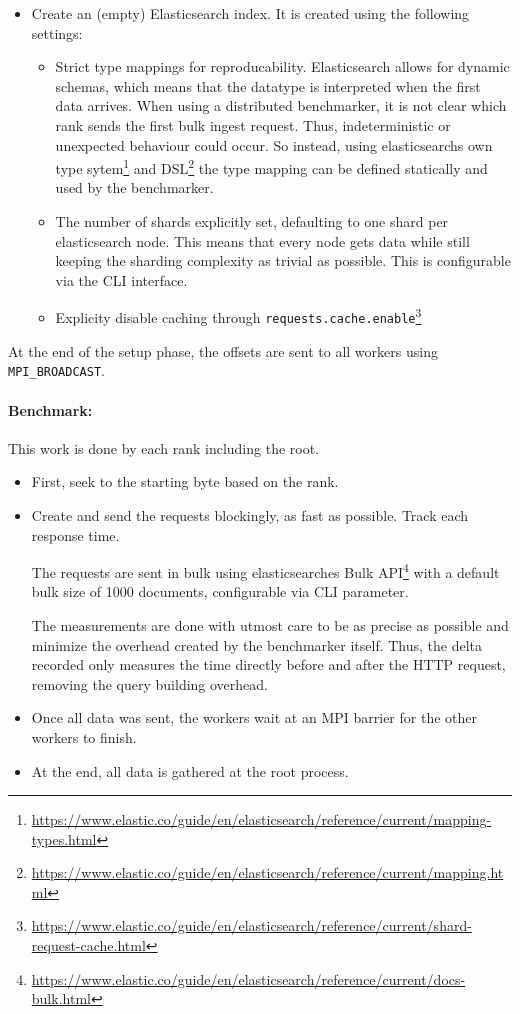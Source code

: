 \begin{itemize}
  \item Create an (empty) Elasticsearch index. It is created using the following settings:
    \begin{itemize}
      \item Strict type mappings for reproducability. Elasticsearch allows for dynamic schemas, which means that the datatype is interpreted when the first data arrives. When using a distributed benchmarker, it is not clear which rank sends the first bulk ingest request. Thus, indeterministic or unexpected behaviour could occur. So instead, using elasticsearchs own type sytem\footnote{\url{https://www.elastic.co/guide/en/elasticsearch/reference/current/mapping-types.html}} and \ac{DSL}\footnote{\url{https://www.elastic.co/guide/en/elasticsearch/reference/current/mapping.html}} the type mapping can be defined statically and used by the benchmarker.
      \item The number of shards explicitly set, defaulting to one shard per elasticsearch node. This means that every node gets data while still keeping the sharding complexity as trivial as possible. This is configurable via the \ac{CLI} interface.
      \item Explicity disable caching through \texttt{requests.cache.enable}\footnote{\url{https://www.elastic.co/guide/en/elasticsearch/reference/current/shard-request-cache.html}}
    \end{itemize}
\end{itemize}
At the end of the setup phase, the offsets are sent to all workers using \texttt{MPI\_BROADCAST}.

\paragraph{Benchmark:} This work is done by each rank including the root.
\begin{itemize}
  \item First, seek to the starting byte based on the rank.
  \item Create and send the requests blockingly, as fast as possible. Track each response time.

    The requests are sent in bulk using elasticsearches Bulk API\footnote{\url{https://www.elastic.co/guide/en/elasticsearch/reference/current/docs-bulk.html}} with a default bulk size of 1000 documents, configurable via CLI parameter.

    The measurements are done with utmost care to be as precise as possible and minimize the overhead created by the benchmarker itself. Thus, the delta recorded only measures the time directly before and after the HTTP request, removing the query building overhead.
  \item Once all data was sent, the workers wait at an \ac{MPI} barrier for the other workers to finish.
  \item At the end, all data is gathered at the root process.
\end{itemize}

